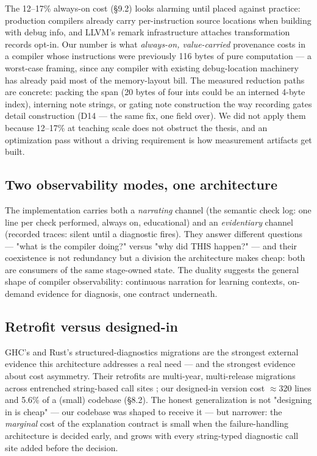 The 12--17\% always-on cost (\S9.2) looks alarming until placed against
practice: production compilers already carry per-instruction source
locations when building with debug info, and LLVM's remark
infrastructure \cite{llvm-remarks} attaches transformation records opt-in. Our
number is what \emph{always-on, value-carried} provenance costs in a
compiler whose instructions were previously 116 bytes of pure
computation --- a worst-case framing, since any compiler with existing
debug-location machinery has already paid most of the memory-layout
bill. The measured reduction paths are concrete: packing the span
(20 bytes of four ints could be an interned 4-byte index), interning
note strings, or gating note construction the way recording gates
detail construction (D14 --- the same fix, one field over). We did not
apply them because 12--17\% at teaching scale does not obstruct the
thesis, and an optimization pass without a driving requirement is
how measurement artifacts get built.

\subsection{Two observability modes, one architecture}

The implementation carries both a \emph{narrating} channel (the semantic
check log: one line per check performed, always on, educational) and
an \emph{evidentiary} channel (recorded traces: silent until a diagnostic
fires). They answer different questions --- "what is the compiler
doing?" versus "why did THIS happen?" --- and their coexistence is not
redundancy but a division the architecture makes cheap: both are
consumers of the same stage-owned state. The duality suggests the
general shape of compiler observability: continuous narration for
learning contexts, on-demand evidence for diagnosis, one contract
underneath.

\subsection{Retrofit versus designed-in}

GHC's and Rust's structured-diagnostics migrations \cite{ghc-structured-errors,welltyped2021ghc,rust-rfc1644} are the
strongest external evidence this architecture addresses a real need
--- and the strongest evidence about cost asymmetry. Their retrofits
are multi-year, multi-release migrations across entrenched
string-based call sites \cite{ghc-structured-errors,welltyped2021ghc}; our designed-in version cost $\approx$320
lines and 5.6\% of a (small) codebase (\S8.2). The honest generalization is not "designing
in is cheap" --- our codebase was shaped to receive it --- but
narrower: the \emph{marginal} cost of the explanation contract is small
when the failure-handling architecture is decided early, and grows
with every string-typed diagnostic call site added before the
decision.

